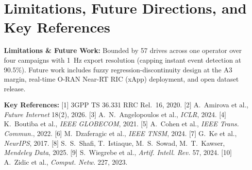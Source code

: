 \documentclass[10pt,a4paper]{article}
\begin{document}
\section{Limitations, Future Directions, and Key References}
\textbf{Limitations \& Future Work:} Bounded by 57 drives across one operator over four campaigns with 1~Hz export resolution (capping instant event detection at 90.5\%). Future work includes fuzzy regression-discontinuity design at the A3 margin, real-time O-RAN Near-RT RIC (xApp) deployment, and open dataset release.

\vspace{3pt}
\fontsize{7.8pt}{10.0pt}\selectfont
\textbf{Key References:}
[1] 3GPP TS 36.331 RRC Rel.~16, 2020.
[2] A.~Amirova et al., \textit{Future Internet} 18(2), 2026.
[3] A.~N.~Angelopoulos et al., \textit{ICLR}, 2024.
[4] K.~Boutiba et al., \textit{IEEE GLOBECOM}, 2021.
[5] A.~Cohen et al., \textit{IEEE Trans. Commun.}, 2022.
[6] M.~Dzaferagic et al., \textit{IEEE TNSM}, 2024.
[7] G.~Ke et al., \textit{NeurIPS}, 2017.
[8] S.~S.~Shafi, T.~Istiaque, M.~S.~Sowad, M.~T.~Kawser, \textit{Mendeley Data}, 2025.
[9] S.~Wiegrebe et al., \textit{Artif. Intell. Rev.} 57, 2024.
[10] A.~Zidic et al., \textit{Comput. Netw.} 227, 2023.
\end{document}
